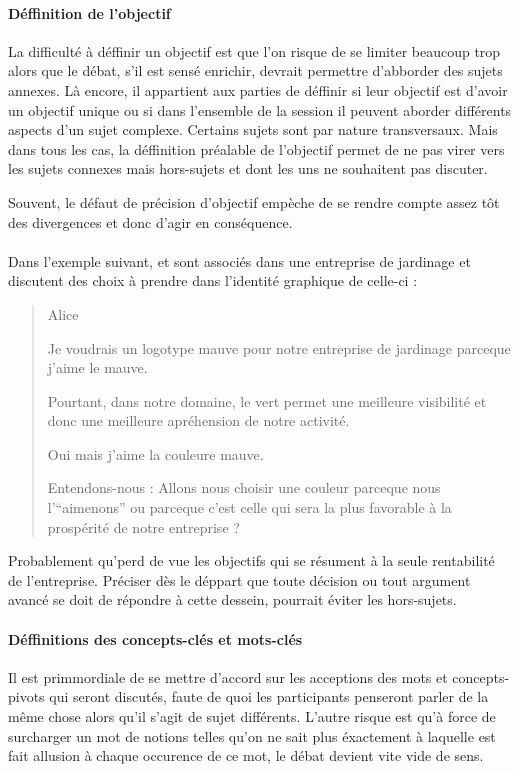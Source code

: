 \paragraph{Déffinition de l’objectif}
La difficulté à déffinir un objectif est que l’on risque de se limiter beaucoup trop alors que le débat, s’il est sensé enrichir, devrait permettre d’abborder des sujets annexes. Là encore, il appartient aux parties de déffinir si leur objectif est d’avoir un objectif unique ou si dans l’ensemble de la session il peuvent aborder différents aspects d’un sujet complexe. Certains sujets sont par nature transversaux. Mais dans tous les cas, la déffinition préalable de l’objectif permet de ne pas virer vers les sujets connexes mais hors-sujets et dont les uns ne souhaitent pas discuter.

Souvent, le défaut de précision d’objectif empèche de se rendre compte assez tôt des divergences et donc d’agir en conséquence.

\paragraph{}
Dans l’exemple suivant, \A et \B sont associés dans une entreprise de jardinage et discutent des choix à prendre dans l’identité graphique de celle-ci :

\begin{quote}
  \begin{drama}{0cm}{0cm}{Alice}

    \Aspeaks Je voudrais un logotype mauve pour notre entreprise de jardinage parceque j’aime le mauve.

    \Bspeaks Pourtant, dans notre domaine, le vert permet une meilleure visibilité et donc une meilleure apréhension de notre activité.

    \Aspeaks Oui mais j’aime la couleure mauve.

    \Bspeaks Entendons-nous : Allons nous choisir une couleur parceque nous l’\enquote{aimenons} ou parceque c’est celle qui sera la plus favorable à la prospérité de notre entreprise ?

  \end{drama}
\end{quote}

Probablement qu’\A perd de vue les objectifs qui se résument à la seule rentabilité de l’entreprise. Préciser dès le déppart que toute décision ou tout argument avancé se doit de répondre à cette dessein, pourrait éviter les hors-sujets.

\paragraph{Déffinitions des concepts-clés et mots-clés}
Il est primmordiale de se mettre d’accord sur les acceptions des mots et concepts-pivots qui seront discutés, faute de quoi les participants penseront parler de la même chose alors qu’il s’agit de sujet différents. L’autre risque est qu’à force de surcharger un mot de notions telles qu’on ne sait plus éxactement à laquelle est fait allusion à chaque occurence de ce mot, le débat devient vite vide de sens.

